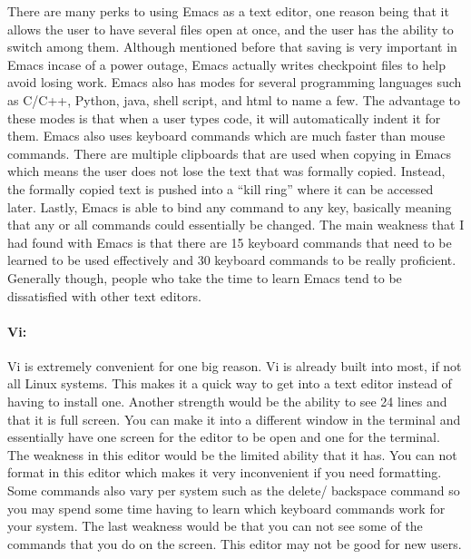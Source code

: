 \documentclass{article} %
\begin{document}
\noindent 

\noindent There are many perks to using Emacs as a text editor, one reason being that it allows the user to have several files open at once, and the user has the ability to switch among them. Although mentioned before that saving is very important in Emacs incase of a power outage, Emacs actually writes checkpoint files to help avoid losing work. Emacs also has modes for several programming languages such as C/C++, Python, java, shell script, and html to name a few. The advantage to these modes is that when a user types code, it will automatically indent it for them. Emacs also uses keyboard commands which are much faster than mouse commands. There are multiple clipboards that are used when copying in Emacs which means the user does not lose the text that was formally copied. Instead, the formally copied text is pushed into a ``kill ring'' where it can be accessed later. Lastly, Emacs is able to bind any command to any key, basically meaning that any or all commands could essentially be changed. The main weakness that I had found with Emacs is that there are 15 keyboard commands that need to be learned to be used effectively and 30 keyboard commands to be really proficient. Generally though, people who take the time to learn Emacs tend to be dissatisfied with other text editors.

\noindent 

\noindent 
\paragraph{Vi:}

\noindent 

\noindent Vi is extremely convenient for one big reason. Vi is already built into most, if not all Linux systems. This makes it a quick way to get into a text editor instead of having to install one. Another strength would be the ability to see 24 lines and that it is full screen. You can make it into a different window in the terminal and essentially have one screen for the editor to be open and one for the terminal. The weakness in this editor would be the limited ability that it has. You can not format in this editor which makes it very inconvenient if you need formatting. Some commands also  vary per system such as the delete/ backspace command so you may spend some time having to learn which keyboard commands work for your system. The last weakness would be that you can not see some of the commands that you do on the screen. This editor may not be good for new users. 
\end{document}
